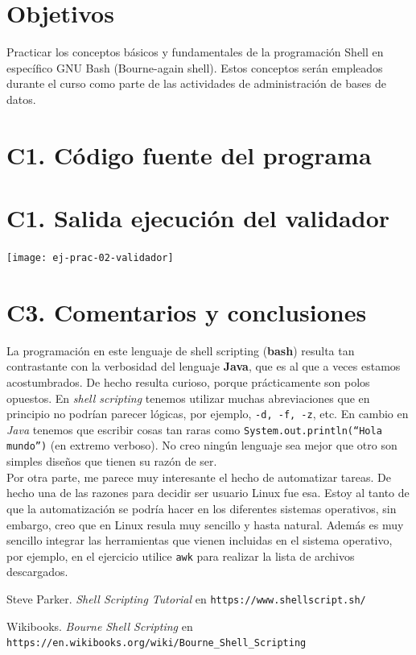 \documentclass{article}
\begin{document}
\section*{Objetivos}
Practicar los conceptos básicos y fundamentales de la programación Shell en 
específico GNU Bash (Bourne-again shell). Estos conceptos serán empleados
durante el curso como parte de las actividades de administración de bases de 
datos.

\section*{C1. Código fuente del programa}



\section*{C1. Salida ejecución del validador}

\begin{center}
    \texttt{[image: ej-prac-02-validador]}    
\end{center}

\newpage
\section*{C3. Comentarios y conclusiones}

La programación en este lenguaje de shell scripting (\textbf{bash}) resulta 
tan contrastante con la verbosidad del lenguaje \textbf{Java}, que es al que a 
veces estamos acostumbrados. De hecho resulta curioso, porque prácticamente 
son polos opuestos. En \textit{shell scripting} tenemos utilizar muchas 
abreviaciones que en principio no podrían parecer lógicas, por ejemplo, 
\texttt{-d, -f, -z}, etc. En cambio en \textit{Java} tenemos que escribir cosas
tan raras como \texttt{System.out.println(``Hola mundo'')} (en extremo verboso).
No creo ningún lenguaje sea mejor que otro son simples diseños que  tienen su 
razón de ser.\\ 

Por otra parte, me parece muy interesante el hecho de automatizar tareas. De 
hecho una de las razones para decidir ser usuario Linux fue esa. Estoy al tanto
de que la automatización se podría hacer en los diferentes sistemas operativos,
sin embargo, creo que en Linux resula muy sencillo y hasta natural. Además 
es muy sencillo integrar las herramientas que vienen incluidas en el sistema
operativo, por ejemplo, en el ejercicio utilice \texttt{awk} para realizar 
la lista de archivos descargados.

\renewcommand\refname{Bibliografía y referencias}
\begin{thebibliography}{99}
     Steve Parker. \textit{Shell Scripting Tutorial} en 
    \texttt{https://www.shellscript.sh/}

     Wikibooks. \textit{Bourne Shell Scripting} en 
        \texttt{https://en.wikibooks.org/wiki/Bourne\_Shell\_Scripting}
\end{thebibliography}
\end{document}
